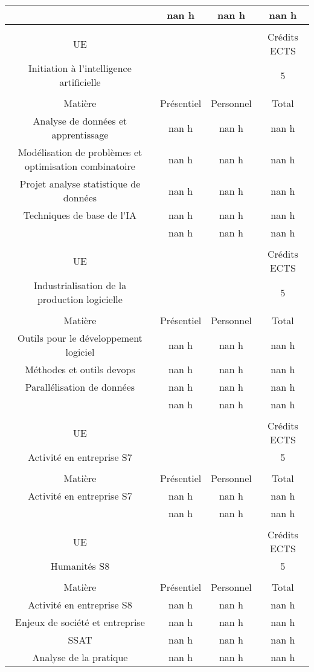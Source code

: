 \begin{longtable}{c c c c}
\hline%
&nan h&nan h&nan h\\%
\hline%
&&&\\%
UE&&&Crédits ECTS\\%
Initiation à l'intelligence artificielle&&&5\\%
&&&\\%
Matière&Présentiel&Personnel&Total\\%
Analyse de données et apprentissage&nan h&nan h&nan h\\%
Modélisation de problèmes et optimisation combinatoire&nan h&nan h&nan h\\%
Projet analyse statistique de données&nan h&nan h&nan h\\%
Techniques de base de l'IA&nan h&nan h&nan h\\%
\hline%
&nan h&nan h&nan h\\%
\hline%
&&&\\%
UE&&&Crédits ECTS\\%
Industrialisation de la production logicielle&&&5\\%
&&&\\%
Matière&Présentiel&Personnel&Total\\%
Outils pour le développement logiciel &nan h&nan h&nan h\\%
Méthodes et outils devops&nan h&nan h&nan h\\%
Parallélisation de données&nan h&nan h&nan h\\%
\hline%
&nan h&nan h&nan h\\%
\hline%
&&&\\%
UE&&&Crédits ECTS\\%
Activité en entreprise S7&&&5\\%
&&&\\%
Matière&Présentiel&Personnel&Total\\%
Activité en entreprise S7&nan h&nan h&nan h\\%
\hline%
&nan h&nan h&nan h\\%
\hline%
&&&\\%
UE&&&Crédits ECTS\\%
Humanités S8&&&5\\%
&&&\\%
Matière&Présentiel&Personnel&Total\\%
Activité en entreprise S8&nan h&nan h&nan h\\%
Enjeux de société et entreprise&nan h&nan h&nan h\\%
SSAT&nan h&nan h&nan h\\%
Analyse de la pratique&nan h&nan h&nan h\\%

\end{longtable}
